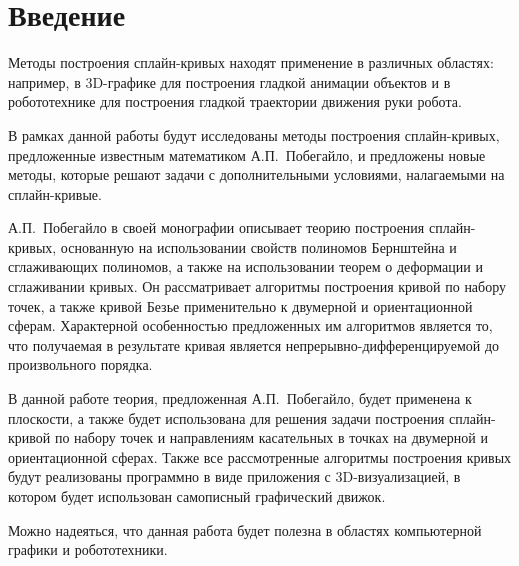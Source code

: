 \chapter*{Введение}

Методы построения сплайн-кривых находят применение в различных областях: например, в 3D-графике для построения гладкой
анимации объектов и в робототехнике для построения гладкой траектории движения руки робота.

В рамках данной работы будут исследованы методы построения сплайн-кривых, предложенные известным математиком
А.П.~Побегайло, и предложены новые методы, которые решают задачи с дополнительными условиями, налагаемыми на
сплайн-кривые.

А.П.~Побегайло в своей монографии \cite{pobegaylo} описывает теорию построения сплайн-кривых, основанную на
использовании свойств полиномов Бернштейна и сглаживающих полиномов, а также на использовании теорем о деформации и
сглаживании кривых. Он рассматривает алгоритмы построения кривой по набору точек, а также кривой Безье применительно
к двумерной и ориентационной сферам. Характерной особенностью предложенных им алгоритмов является то, что получаемая
в результате кривая является непрерывно-дифференцируемой до произвольного порядка.

В данной работе теория, предложенная А.П.~Побегайло, будет применена к плоскости, а также будет использована для
решения задачи построения сплайн-кривой по набору точек и направлениям касательных в точках на двумерной и
ориентационной сферах. Также все рассмотренные алгоритмы построения кривых будут реализованы программно в виде
приложения с 3D-визуализацией, в котором будет использован самописный графический движок.

Можно надеяться, что данная работа будет полезна в областях компьютерной графики и робототехники.
